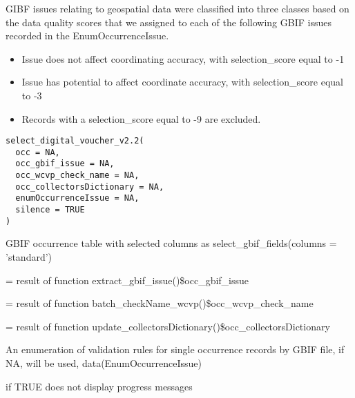 \documentclass[a4paper]{book}
\begin{document}
\begin{Description}
\begin{itemize}
\end{itemize}


GIBF issues relating to geospatial data were classified into three classes based on the data quality
scores that we assigned to each of the following GBIF issues recorded in the EnumOccurrenceIssue.
\begin{itemize}

\item{} Issue does not affect coordinating accuracy, with selection\_score equal to -1
\item{} Issue has potential to affect coordinate accuracy, with selection\_score equal to -3
\item{} Records with a selection\_score equal to -9 are excluded.

\end{itemize}

\end{Description}
%
\begin{Usage}
\begin{verbatim}
select_digital_voucher_v2.2(
  occ = NA,
  occ_gbif_issue = NA,
  occ_wcvp_check_name = NA,
  occ_collectorsDictionary = NA,
  enumOccurrenceIssue = NA,
  silence = TRUE
)
\end{verbatim}
\end{Usage}
%
\begin{Arguments}
\begin{ldescription}
\item[\code{occ}] GBIF occurrence table with selected columns as select\_gbif\_fields(columns = 'standard')

\item[\code{occ\_gbif\_issue}] = result of function extract\_gbif\_issue()\$occ\_gbif\_issue

\item[\code{occ\_wcvp\_check\_name}] = result of function batch\_checkName\_wcvp()\$occ\_wcvp\_check\_name

\item[\code{occ\_collectorsDictionary}] = result of function update\_collectorsDictionary()\$occ\_collectorsDictionary

\item[\code{enumOccurrenceIssue}] An enumeration of validation rules for single occurrence records by GBIF file, if NA, will be used, data(EnumOccurrenceIssue)

\item[\code{silence}] if TRUE does not display progress messages
\end{ldescription}
\end{Arguments}
\end{document}
